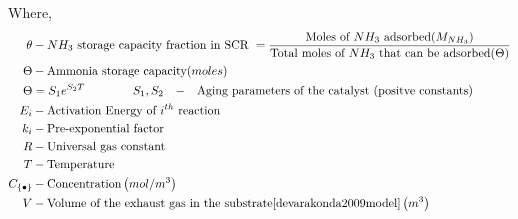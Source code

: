 Where,
\begin{align*}
    \theta &- NH_3 \text{ storage capacity fraction in SCR } = \frac{\text{Moles of $NH_3$ adsorbed} (M_{NH_3})}{\text{Total moles of $NH_3$ that can be adsorbed} (\Theta)}\\
    \Theta &- \text{Ammonia storage capacity} (moles)\\
    \Theta &= S_1 e^{S_2 T} \qquad \qquad \begin{matrix*}[l]
                S_1, S_2 &-& \text{Aging parameters of the catalyst (positve constants)}
            \end{matrix*}\\
    E_i &- \text{Activation Energy of $i^{th}$ reaction}\\
    k_i &- \text{Pre-exponential factor}\\
    R &- \text{Universal gas constant}\\
    T &- \text{Temperature}\\
    C_{\{\bullet\}} &- \text{Concentration} \lr{mol/m^3}\\
    V &- \text{Volume of the exhaust gas in the substrate\cite{devarakonda2009model}} \lr{m^3}\\
\end{align*}
